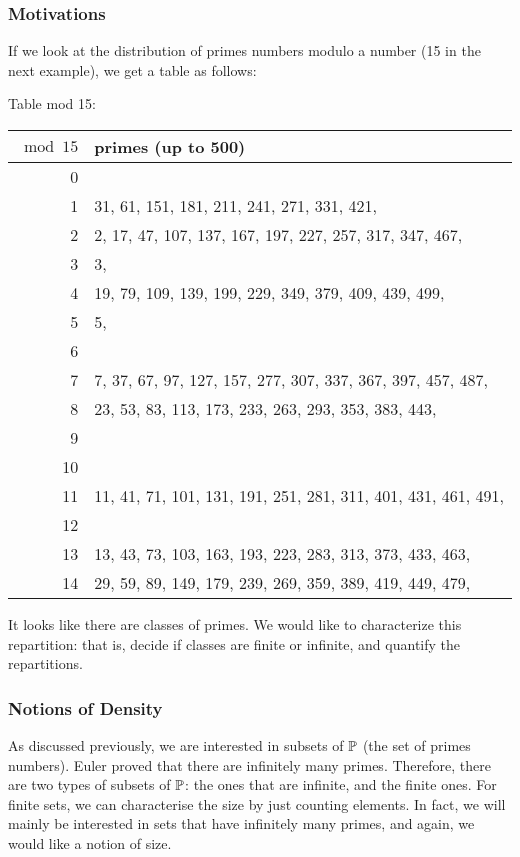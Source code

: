\subsubsection{Motivations}
\label{DensityMotivation}
If we look at the distribution of primes numbers modulo a number (15 in the next example), we get a table as follows:

Table mod 15:
\begin{center}
	\begin{tabular}{r|l}
		$\bmod 15$ & primes (up to 500)\\
		\hline
		0& \\
		1& 31, 61, 151, 181, 211, 241, 271, 331, 421, \\
		2& 2, 17, 47, 107, 137, 167, 197, 227, 257, 317, 347, 467, \\
		3& 3, \\
		4& 19, 79, 109, 139, 199, 229, 349, 379, 409, 439, 499, \\
		5& 5, \\
		6& \\
		7& 7, 37, 67, 97, 127, 157, 277, 307, 337, 367, 397, 457, 487, \\
		8& 23, 53, 83, 113, 173, 233, 263, 293, 353, 383, 443, \\
		9& \\
		10& \\
		11& 11, 41, 71, 101, 131, 191, 251, 281, 311, 401, 431, 461, 491, \\
		12& \\
		13& 13, 43, 73, 103, 163, 193, 223, 283, 313, 373, 433, 463, \\
		14& 29, 59, 89, 149, 179, 239, 269, 359, 389, 419, 449, 479, \\
	\end{tabular}
\end{center}
It looks like there are classes of primes.
We would like to characterize this repartition: that is, decide if classes are finite or infinite, and quantify the repartitions.



\subsubsection{Notions of Density}
As discussed previously, we are interested in subsets of $\mathbb{P}$ (the set of primes numbers).
Euler proved that there are infinitely many primes.
Therefore, there are two types of subsets of $\mathbb{P}$: the ones that are infinite, and the finite ones.
For finite sets, we can characterise the size by just counting elements.
In fact, we will mainly be interested in sets that have infinitely many primes, and again, we would like a notion of size.

